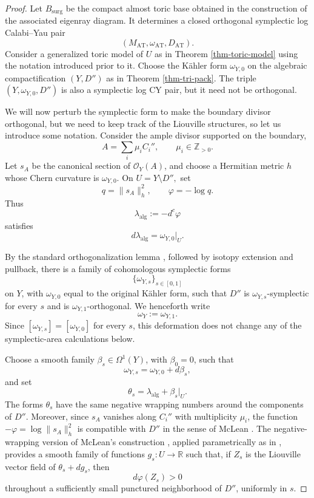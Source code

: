 \documentclass[11pt, reqno]{amsart}
\theoremstyle{definition}
\begin{document}
\begin{proof}
Let $B_{\mathrm{surg}}$ be the compact almost toric base obtained in the
construction of the associated eigenray diagram. It determines a closed
orthogonal symplectic log Calabi--Yau pair
\[
(M_{\mathrm{AT}},\omega_{\mathrm{AT}},D_{\mathrm{AT}}).
\]
Consider a generalized toric model of $U$ as in Theorem \ref{thm-toric-model} using the notation introduced prior to it. Choose the K\"ahler form $\omega_{Y,0}$ on the algebraic
compactification $(Y,D'')$ as in Theorem \ref{thm-tri-pack}. The triple $(Y, \omega_{Y,0}, D'')$ is also a symplectic log CY pair, but it need not be orthogonal.

We will now perturb the symplectic form to make the boundary divisor orthogonal, but we need to keep track of the Liouville structures, so let us introduce some notation. Consider the ample divisor supported on the boundary,
\[
A=\sum_i \mu_iC_i'',
\qquad
\mu_i\in\mathbb Z_{>0}.
\]
Let $s_A$ be the
canonical section of $\mathcal O_Y(A)$, and choose a Hermitian metric
$h$ whose Chern curvature is $\omega_{Y,0}$. On $U=Y\setminus D'',$ set
\[
q=\lVert s_A\rVert_h^2,
\qquad
\varphi=-\log q.
\]
Thus
\[
\lambda_{\mathrm{alg}}:=-d^c\varphi
\]
satisfies
\[
d\lambda_{\mathrm{alg}}=\omega_{Y,0}|_U.
\]

By the standard orthogonalization lemma
\cite[Lemma~2.3]{Gompf1995}, followed by isotopy extension and
pullback, there is a family of cohomologous symplectic forms
\[
\{\omega_{Y,s}\}_{s\in[0,1]}
\]
on \(Y\), with \(\omega_{Y,0}\) equal to the original K\"ahler form,
such that \(D''\) is \(\omega_{Y,s}\)-symplectic for every \(s\) and is
\(\omega_{Y,1}\)-orthogonal. We henceforth write
\[
\omega_Y:=\omega_{Y,1}.
\]
Since $[\omega_{Y,s}]=[\omega_{Y,0}]$
for every $s$, this deformation does not change any of the
symplectic-area calculations below.



Choose a smooth family
\(\beta_s\in\Omega^1(Y)\), with \(\beta_0=0\), such that
\[
\omega_{Y,s}=\omega_{Y,0}+d\beta_s,
\]
and set
\[
\theta_s=\lambda_{\mathrm{alg}}+\beta_s|_U.
\]
The forms \(\theta_s\) have the same negative wrapping numbers around
the components of \(D''\). Moreover, since $s_A$ vanishes along $C_i''$ with multiplicity
$\mu_i$, the function $-\varphi=\log\lVert s_A\rVert_h^2$ is
compatible with $D''$ in the sense of McLean
\cite[page~26]{McLean2016}. The negative-wrapping version of McLean's construction
\cite[Proposition~2.5]{LiMakCapping}, applied parametrically as in
\cite[Proposition~5.10]{McLean2016},
provides a smooth family of functions \(g_s\colon U\to\mathbb{R}\)
such that, if \(Z_s\) is the Liouville vector field of
\(\theta_s+dg_s\), then
\[
d\varphi(Z_s)>0
\]
throughout a sufficiently small punctured neighborhood of \(D''\),
uniformly in \(s\). 


\end{proof}
\end{document}
